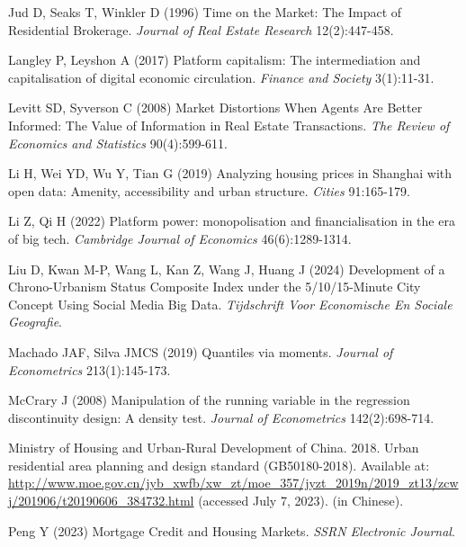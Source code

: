 \documentclass[11pt]{article}
\begin{document}
\begin{singlespace}
\begin{thebibliography}{}
Jud D, Seaks T, Winkler D (1996) Time on the Market: The Impact of Residential Brokerage. \textit{Journal of Real Estate Research} 12(2):447-458.

Langley P, Leyshon A (2017) Platform capitalism: The intermediation and capitalisation of digital economic circulation. \textit{Finance and Society} 3(1):11-31.

Levitt SD, Syverson C (2008) Market Distortions When Agents Are Better Informed: The Value of Information in Real Estate Transactions. \textit{The Review of Economics and Statistics} 90(4):599-611.

Li H, Wei YD, Wu Y, Tian G (2019) Analyzing housing prices in Shanghai with open data: Amenity, accessibility and urban structure. \textit{Cities} 91:165-179.

Li Z, Qi H (2022) Platform power: monopolisation and financialisation in the era of big tech. \textit{Cambridge Journal of Economics} 46(6):1289-1314.

Liu D, Kwan M-P, Wang L, Kan Z, Wang J, Huang J (2024) Development of a Chrono-Urbanism Status Composite Index under the 5/10/15-Minute City Concept Using Social Media Big Data. \textit{Tijdschrift Voor Economische En Sociale Geografie}.

Machado JAF, Silva JMCS (2019) Quantiles via moments. \textit{Journal of Econometrics} 213(1):145-173.


McCrary J (2008) Manipulation of the running variable in the regression discontinuity design: A density test. \textit{Journal of Econometrics} 142(2):698-714.

Ministry of Housing and Urban-Rural Development of China. 2018. Urban residential area planning and design standard (GB50180-2018). Available at: \url{http://www.moe.gov.cn/jyb_xwfb/xw_zt/moe_357/jyzt_2019n/2019_zt13/zcwj/201906/t20190606_384732.html} (accessed July 7, 2023). (in Chinese).

Peng Y (2023) Mortgage Credit and Housing Markets. \textit{SSRN Electronic Journal}. %


\end{thebibliography}
\end{singlespace}
\end{document}
